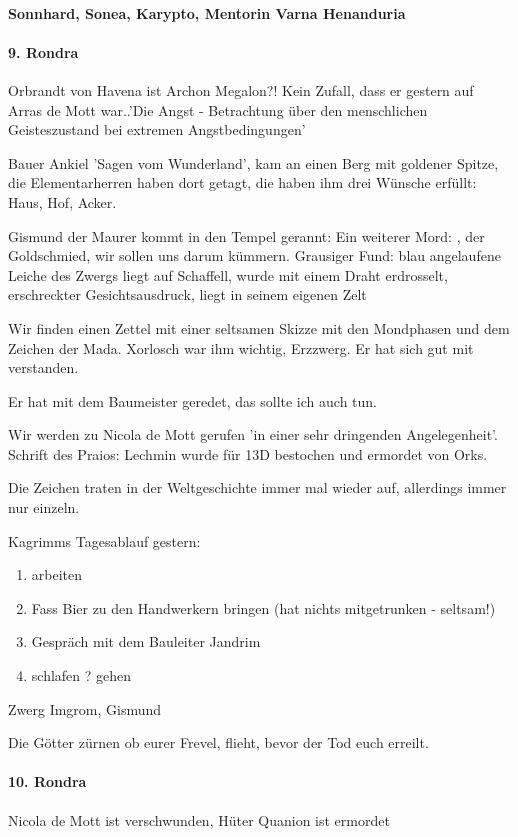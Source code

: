 \paragraph{Sonnhard, Sonea, Karypto, Mentorin Varna Henanduria}

\paragraph{9. Rondra}

Orbrandt von Havena ist Archon Megalon?! Kein Zufall, dass er gestern auf Arras de Mott war..'Die Angst - Betrachtung über den menschlichen Geisteszustand bei extremen Angstbedingungen'

Bauer Ankiel 'Sagen vom Wunderland', kam an einen Berg mit goldener Spitze, die Elementarherren haben dort getagt, die haben ihm drei Wünsche erfüllt: Haus, Hof, Acker.   


Gismund der Maurer kommt in den Tempel gerannt: Ein weiterer Mord: , der Goldschmied, wir sollen uns darum kümmern. Grausiger Fund: blau angelaufene Leiche des Zwergs liegt auf Schaffell, wurde mit einem Draht erdrosselt, erschreckter Gesichtsausdruck, liegt in seinem eigenen Zelt 

Wir finden einen Zettel mit einer seltsamen Skizze mit den Mondphasen und dem Zeichen der Mada. Xorlosch war ihm wichtig, Erzzwerg. Er hat sich gut mit  verstanden. 

Er hat mit dem Baumeister geredet, das sollte ich auch tun. 

Wir werden zu Nicola de Mott gerufen 'in einer sehr dringenden Angelegenheit'. Schrift des Praios: Lechmin wurde für 13D bestochen und ermordet von Orks. 

Die Zeichen traten in der Weltgeschichte immer mal wieder auf, allerdings immer nur einzeln. 

Kagrimms Tagesablauf gestern:
\begin{enumerate}
\item arbeiten
\item Fass Bier zu den Handwerkern bringen (hat nichts mitgetrunken - seltsam!)
\item Gespräch mit dem Bauleiter Jandrim
\item schlafen ? gehen
\end{enumerate}

Zwerg  Imgrom, Gismund 

Die Götter zürnen ob eurer Frevel, flieht, bevor der Tod euch erreilt. 
\paragraph{10. Rondra}
Nicola de Mott ist verschwunden, Hüter Quanion ist ermordet

